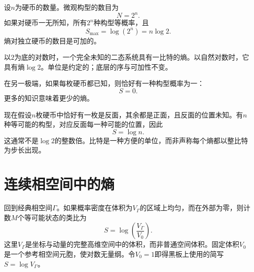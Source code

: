 设\(n\)为硬币的数量。微观构型的数目为
\begin{equation}
 N=2^n.
 \label{eq:sm1-coin-state-count}
\end{equation}
如果对硬币一无所知，所有\(2^n\)种构型等概率，且
\begin{equation}
 S_{\max}=\log(2^n)=n\log2.
 \label{eq:sm1-coin-max-entropy}
\end{equation}
熵对独立硬币的数目是可加的。

以\(2\)为底的对数时，一个完全未知的二态系统具有一比特的熵。以自然对数时，它具有熵\(\log2\)。单位是约定的；底层的序与可加性不变。

在另一极端，如果每枚硬币都已知，则恰好有一种构型概率为一：
\begin{equation}
 S=0.
\end{equation}
更多的知识意味着更少的熵。

现在假设\(n\)枚硬币中恰好有一枚是反面，其余都是正面，且反面的位置未知。有\(n\)种等可能的构型，对应反面每一种可能的位置，因此
\begin{equation}
 S=\log n.
 \label{eq:sm1-one-tail-entropy}
\end{equation}
这通常不是\(\log2\)的整数倍。比特是一种方便的单位，而非声称每个熵都以整比特为步长出现。

\begin{classroomqa}
\end{classroomqa}

\begin{classroomqa}
\end{classroomqa}

\section{连续相空间中的熵}

回到经典相空间\(\Gamma\)。如果概率密度在体积为\(V_\Gamma\)的区域上均匀，而在外部为零，则计数\(M\)个等可能状态的类比为
\begin{equation}
 S=\log\!\left(\frac{V_\Gamma}{V_0}\right).
 \label{eq:sm1-continuous-uniform}
\end{equation}
这里\(V_\Gamma\)是坐标与动量的完整高维空间中的体积，而非普通空间体积。固定体积\(V_0\)是一个参考相空间元胞，使对数无量纲。令\(V_0=1\)即得黑板上使用的简写\(S=\log V_\Gamma\)。

